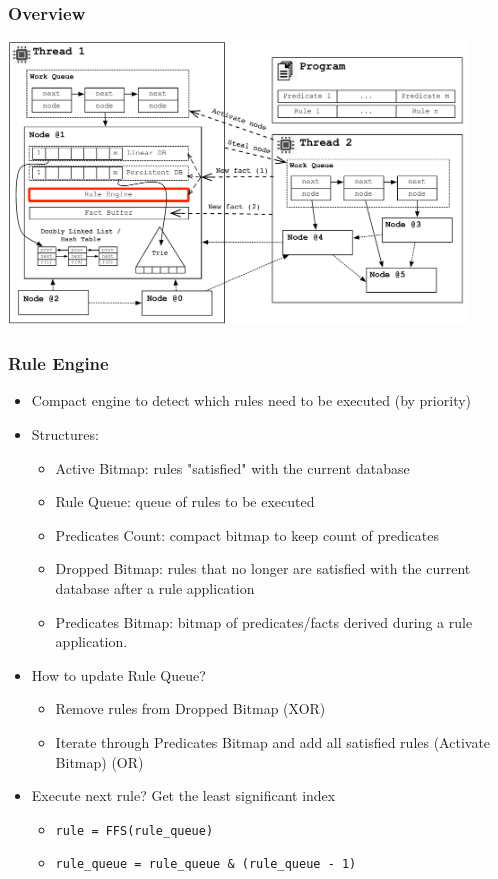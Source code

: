 \documentclass{beamer}
\begin{document}
\begin{frame}[fragile]
   \frametitle{Overview}
   \includegraphics[height=7.5cm]{overview3.pdf}
\end{frame}

\begin{frame}[fragile]
   \frametitle{Rule Engine}
   \begin{itemize}
      \item Compact engine to detect which rules need to be executed (by priority)
      \item Structures:
      \begin{itemize}
         \item Active Bitmap: rules "satisfied" with the current database
         \item Rule Queue: queue of rules to be executed
         \item Predicates Count: compact bitmap to keep count of predicates
         \item Dropped Bitmap: rules that no longer are satisfied with the current database after a rule application
         \item Predicates Bitmap: bitmap of predicates/facts derived during a rule application.
      \end{itemize}
      \item How to update Rule Queue?
      \begin{itemize}
         \item Remove rules from Dropped Bitmap (XOR)
         \item Iterate through Predicates Bitmap and add all satisfied rules (Activate Bitmap) (OR)
      \end{itemize}
      \item Execute next rule? Get the least significant index
      \begin{itemize}
         \item \texttt{rule = FFS(rule\_queue)}
         \item \texttt{rule\_queue = rule\_queue \& (rule\_queue - 1)}
      \end{itemize}
   \end{itemize}
\end{frame}
\end{document}
